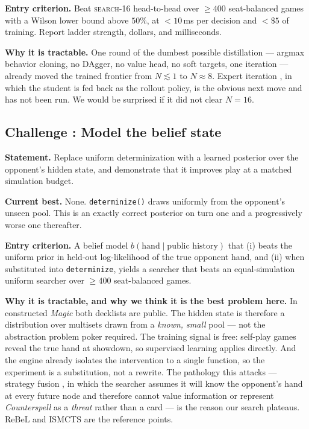 \documentclass[11pt]{article}
\newcommand{\searchn}[1]{\textsc{search}-#1}
\newcounter{challenge}
\renewcommand{\thechallenge}{\arabic{challenge}}
\newcommand{\challenge}[2]{%
  \refstepcounter{challenge}%
  \subsection*{Challenge \thechallenge: #1}\label{#2}}
\begin{document}
\textbf{Entry criterion.} Beat \searchn{16} head-to-head over $\ge400$ seat-balanced games with a Wilson lower bound above $50\%$, at $<10$\,ms per decision and $<\$5$ of training. Report ladder strength, dollars, and milliseconds.

\textbf{Why it is tractable.} One round of the dumbest possible distillation --- argmax behavior cloning, no DAgger, no value head, no soft targets, one iteration --- already moved the trained frontier from $N\lesssim1$ to $N\approx8$. Expert iteration \citep{anthony2017exit,silver2018alphazero}, in which the student is fed back as the rollout policy, is the obvious next move and has not been run. We would be surprised if it did not clear $N=16$.

\challenge{Model the belief state}{ch:belief}

\textbf{Statement.} Replace uniform determinization with a learned posterior over the opponent's hidden state, and demonstrate that it improves play at a matched simulation budget.

\textbf{Current best.} None. \texttt{determinize()} draws uniformly from the opponent's unseen pool. This is an exactly correct posterior on turn one and a progressively worse one thereafter.

\textbf{Entry criterion.} A belief model $b(\text{hand} \mid \text{public history})$ that (i) beats the uniform prior in held-out log-likelihood of the true opponent hand, and (ii) when substituted into \texttt{determinize}, yields a searcher that beats an equal-simulation uniform searcher over $\ge400$ seat-balanced games.

\textbf{Why it is tractable, and why we think it is the best problem here.} In constructed \textit{Magic} both decklists are public. The hidden state is therefore a distribution over multisets drawn from a \emph{known, small} pool --- not the abstraction problem poker required. The training signal is free: self-play games reveal the true hand at showdown, so supervised learning applies directly. And the engine already isolates the intervention to a single function, so the experiment is a substitution, not a rewrite. The pathology this attacks --- strategy fusion \citep{frank1998bridge}, in which the searcher assumes it will know the opponent's hand at every future node and therefore cannot value information or represent \textit{Counterspell} as a \emph{threat} rather than a card --- is the reason our search plateaus. ReBeL \citep{brown2020rebel} and ISMCTS \citep{cowling2012ismcts} are the reference points.
\end{document}
